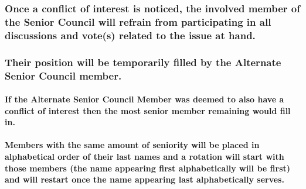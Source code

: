 \documentclass[
]{book}
\begin{document}
\hypertarget{once-a-conflict-of-interest-is-noticed-the-involved-member-of-the-senior-council-will-refrain-from-participating-in-all-discussions-and-votes-related-to-the-issue-at-hand.}{%
\subsubsection{Once a conflict of interest is noticed, the involved member of the Senior Council will refrain from participating in all discussions and vote(s) related to the issue at hand.}\label{once-a-conflict-of-interest-is-noticed-the-involved-member-of-the-senior-council-will-refrain-from-participating-in-all-discussions-and-votes-related-to-the-issue-at-hand.}}

\hypertarget{their-position-will-be-temporarily-filled-by-the-alternate-senior-council-member.}{%
\subsubsection{Their position will be temporarily filled by the Alternate Senior Council member.}\label{their-position-will-be-temporarily-filled-by-the-alternate-senior-council-member.}}

\hypertarget{if-the-alternate-senior-council-member-was-deemed-to-also-have-a-conflict-of-interest-then-the-most-senior-member-remaining-would-fill-in.}{%
\paragraph{If the Alternate Senior Council Member was deemed to also have a conflict of interest then the most senior member remaining would fill in.}\label{if-the-alternate-senior-council-member-was-deemed-to-also-have-a-conflict-of-interest-then-the-most-senior-member-remaining-would-fill-in.}}

\hypertarget{members-with-the-same-amount-of-seniority-will-be-placed-in-alphabetical-order-of-their-last-names-and-a-rotation-will-start-with-those-members-the-name-appearing-first-alphabetically-will-be-first-and-will-restart-once-the-name-appearing-last-alphabetically-serves.}{%
\paragraph{Members with the same amount of seniority will be placed in alphabetical order of their last names and a rotation will start with those members (the name appearing first alphabetically will be first) and will restart once the name appearing last alphabetically serves.}\label{members-with-the-same-amount-of-seniority-will-be-placed-in-alphabetical-order-of-their-last-names-and-a-rotation-will-start-with-those-members-the-name-appearing-first-alphabetically-will-be-first-and-will-restart-once-the-name-appearing-last-alphabetically-serves.}}
\end{document}
